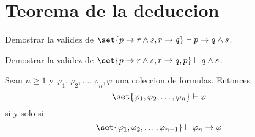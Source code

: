 \section{Teorema de la deduccion}
\begin{example}
	Demostrar la validez de \(\set{p \rightarrow r \wedge  s, r \rightarrow q} \vdash p \rightarrow q \wedge  s \).
\end{example}
\begin{example}
	Demostrar la validez de \(\set{p \rightarrow r \wedge  s, r \rightarrow q,p} \vdash q \wedge  s \).
\end{example}
\begin{theorem}[de la deduccion]
	Sean \(n \geq  1 \) y \(\varphi_1, \varphi_2, \ldots, \varphi_n, \varphi\) una coleccion de formulas. Entonces
	\[
		\set{\varphi_1, \varphi_2, \ldots, \varphi_n} \vdash \varphi
	\]
	si y solo si
	\[
		\set{\varphi_1, \varphi_2, \ldots, \varphi_{n-1}} \vdash \varphi_n \rightarrow \varphi
	\]
\end{theorem}
